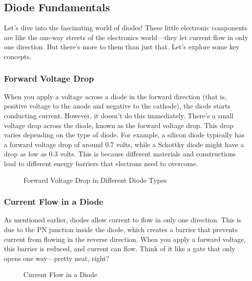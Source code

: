 \subsection{Diode Fundamentals}
\label{subsec:diodes}

Let's dive into the fascinating world of diodes! These little electronic components are like the one-way streets of the electronics world—they let current flow in only one direction. But there's more to them than just that. Let's explore some key concepts.

\subsubsection*{Forward Voltage Drop}
When you apply a voltage across a diode in the forward direction (that is, positive voltage to the anode and negative to the cathode), the diode starts conducting current. However, it doesn't do this immediately. There's a small voltage drop across the diode, known as the forward voltage drop. This drop varies depending on the type of diode. For example, a silicon diode typically has a forward voltage drop of around 0.7 volts, while a Schottky diode might have a drop as low as 0.3 volts. This is because different materials and constructions lead to different energy barriers that electrons need to overcome.

\begin{figure}[h]
    \centering
    \caption{Forward Voltage Drop in Different Diode Types}
    \label{fig:forward_voltage_drop}
\end{figure}

\subsubsection*{Current Flow in a Diode}
As mentioned earlier, diodes allow current to flow in only one direction. This is due to the PN junction inside the diode, which creates a barrier that prevents current from flowing in the reverse direction. When you apply a forward voltage, this barrier is reduced, and current can flow. Think of it like a gate that only opens one way—pretty neat, right?

\begin{figure}[h]
    \centering
    \caption{Current Flow in a Diode}
    \label{fig:diode_current_flow}
\end{figure}

